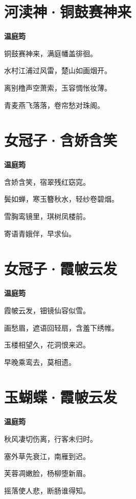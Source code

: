 \documentclass[12pt,a4paper]{ctexbook}
\begin{document}
\section{河渎神·铜鼓赛神来}
\textbf{温庭筠}\par\vspace{0.5em}
铜鼓赛神来，满庭幡盖徘徊。\par
水村江浦过风雷，楚山如画烟开。\par
离别橹声空萧索，玉容惆怅妆薄。\par
青麦燕飞落落，卷帘愁对珠阁。\par

\section{女冠子·含娇含笑}
\textbf{温庭筠}\par\vspace{0.5em}
含娇含笑，宿翠残红窈窕。\par
鬓如蝉，寒玉簪秋水，轻纱卷碧烟。\par
雪胸鸾镜里，琪树凤楼前。\par
寄语青娥伴，早求仙。\par

\section{女冠子·霞帔云发}
\textbf{温庭筠}\par\vspace{0.5em}
霞帔云发，钿镜仙容似雪。\par
画愁眉，遮语回轻扇，含羞下绣帷。\par
玉楼相望久，花洞恨来迟。\par
早晚乘鸾去，莫相遗。\par

\section{玉蝴蝶·霞帔云发}
\textbf{温庭筠}\par\vspace{0.5em}
秋风凄切伤离，行客未归时。\par
塞外草先衰江，南雁到迟。\par
芙蓉凋嫩脸，杨柳堕新眉。\par
摇落使人悲，断肠谁得知。\par
\end{document}
